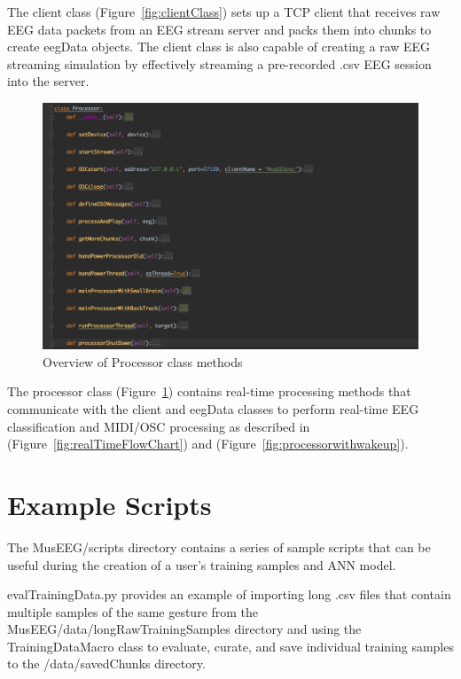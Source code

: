 The client class (Figure~\ref{fig:clientClass}) sets up a TCP client that receives raw EEG data packets from an EEG stream server and packs them into chunks to create eegData objects. The client class is also capable of creating a raw EEG streaming simulation by effectively streaming a pre-recorded .csv EEG session into the server. 


\begin{figure}[H]
	\centering
		\includegraphics[width=1\columnwidth]{processorClass.png}
	\caption{Overview of Processor class methods}
	\label{fig:processorClass}
\end{figure}  
 

The processor class (Figure~\ref{fig:processorClass}) contains real-time processing methods that communicate with the client and eegData classes to perform real-time EEG classification and MIDI/OSC processing as described in (Figure~\ref{fig:realTimeFlowChart}) and (Figure~\ref{fig:processorwithwakeup}).

\pagebreak
\section{Example Scripts}

The MusEEG/scripts directory contains a series of sample scripts that can be useful during the creation of a user’s training samples and ANN model.

evalTrainingData.py provides an example of importing long .csv files that contain multiple samples of the same gesture from the MusEEG/data/longRawTrainingSamples directory and using the TrainingDataMacro class to evaluate, curate, and save individual training samples to the /data/savedChunks directory.

